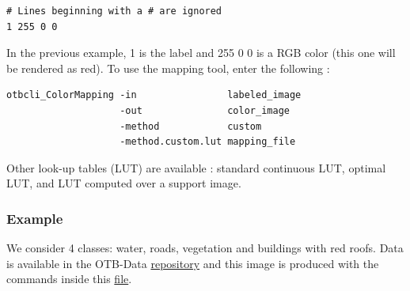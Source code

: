\begin{verbatim}
# Lines beginning with a # are ignored
1 255 0 0
\end{verbatim}

In the previous example, 1 is the label and 255 0 0 is a RGB color
(this one will be rendered as red). To use the mapping tool, enter
the following :

\begin{verbatim}
otbcli_ColorMapping -in                labeled_image
                    -out               color_image
                    -method            custom
                    -method.custom.lut mapping_file
\end{verbatim}

Other look-up tables (LUT) are available : standard continuous LUT,
optimal LUT, and LUT computed over a support image.

\subsubsection{Example}

We consider 4 classes: water, roads, vegetation and buildings with red roofs.
Data is available in the OTB-Data
\href{http://hg.orfeo-toolbox.org/OTB-Data/file/0fed8f4f035c/Input/Classification}{repository}
and this image is produced with the commands inside this
\href{http://hg.orfeo-toolbox.org/OTB-Applications/file/3ce975605013/Testing/Classification/CMakeLists.txt}{file}.

